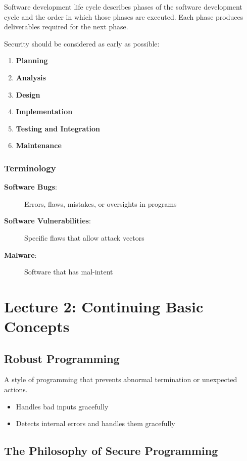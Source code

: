 \documentclass[11pt,a4paper]{article}
\begin{document}
Software development life cycle describes phases of the software development cycle and the order in which those phases are executed. Each phase produces deliverables required for the next phase.

Security should be considered as early as possible:
\begin{enumerate}
    \item \textbf{Planning}
    \item \textbf{Analysis}
    \item \textbf{Design}
    \item \textbf{Implementation}
    \item \textbf{Testing and Integration}
    \item \textbf{Maintenance}
\end{enumerate}

\subsubsection{Terminology}
\begin{description}
    \item[\textbf{Software Bugs}:] Errors, flaws, mistakes, or oversights in programs
    \item[\textbf{Software Vulnerabilities}:] Specific flaws that allow attack vectors
    \item[\textbf{Malware}:] Software that has mal-intent
\end{description}

\section{Lecture 2: Continuing Basic Concepts}

\subsection{Robust Programming}

A style of programming that prevents abnormal termination or unexpected actions.
\begin{itemize}
    \item Handles bad inputs gracefully
    \item Detects internal errors and handles them gracefully
\end{itemize}

\subsection{The Philosophy of Secure Programming}
\end{document}
